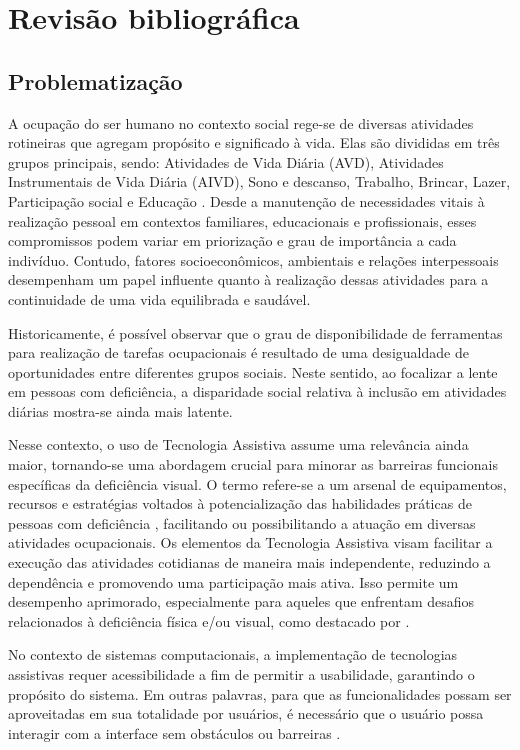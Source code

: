 \chapter{Revisão bibliográfica}
\label{cap:fundamentacao-teorica}

\section{Problematização}

A ocupação do ser humano no contexto social rege-se de diversas atividades rotineiras que agregam propósito e significado à vida. Elas são divididas em três grupos principais, sendo: Atividades de Vida Diária (AVD), Atividades Instrumentais de Vida Diária (AIVD), Sono e descanso, Trabalho, Brincar, Lazer, Participação social e Educação \cite{aota}. Desde a manutenção de necessidades vitais à realização pessoal em contextos familiares, educacionais e profissionais, esses compromissos podem variar em priorização e grau de importância a cada indivíduo. Contudo, fatores socioeconômicos, ambientais e relações interpessoais desempenham um papel influente quanto à realização dessas atividades para a continuidade de uma vida equilibrada e saudável.

Historicamente, é possível observar que o grau de disponibilidade de ferramentas para realização de tarefas ocupacionais é resultado de uma desigualdade de oportunidades entre diferentes grupos sociais. Neste sentido, ao focalizar a lente em pessoas com deficiência, a disparidade social relativa à inclusão em atividades diárias mostra-se ainda mais latente.

Nesse contexto, o uso de Tecnologia Assistiva assume uma relevância ainda maior, tornando-se uma abordagem crucial para minorar as barreiras funcionais específicas da deficiência visual. O termo refere-se a um arsenal de equipamentos, recursos e estratégias voltados à potencialização das habilidades práticas de pessoas com deficiência \cite{TecnologiaAssistivaDeficienciaVisual}, facilitando ou possibilitando a atuação em diversas atividades ocupacionais. Os elementos da Tecnologia Assistiva visam facilitar a execução das atividades cotidianas de maneira mais independente, reduzindo a dependência e promovendo uma participação mais ativa. Isso permite um desempenho aprimorado, especialmente para aqueles que enfrentam desafios relacionados à deficiência física e/ou visual, como destacado por  \cite{BarreirasArquitetonicas}.

No contexto de sistemas computacionais, a implementação de tecnologias assistivas requer acessibilidade a fim de permitir a usabilidade, garantindo o propósito do sistema. Em outras palavras, para que as funcionalidades possam ser aproveitadas em sua totalidade por usuários, é necessário que o usuário possa interagir com a interface sem obstáculos ou barreiras \cite{BarbosaSilva2010}. 

